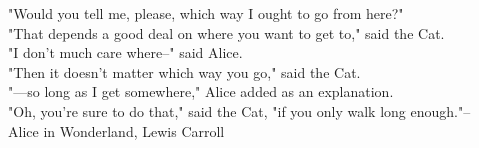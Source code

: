 \label{dedication}
\quad
\vspace{5em}

\begin{flushright}
"Would you tell me, please, which way I ought to go from here?" \\
"That depends a good deal on where you want to get to," said the Cat.\\
"I don't much care where--" said Alice.\\
"Then it doesn't matter which way you go," said the Cat.\\
"—so long as I get somewhere," Alice added as an explanation.\\
"Oh, you're sure to do that," said the Cat, "if you only walk long enough."--\\
\vspace{1cm}
Alice in Wonderland, Lewis Carroll
\end{flushright}

